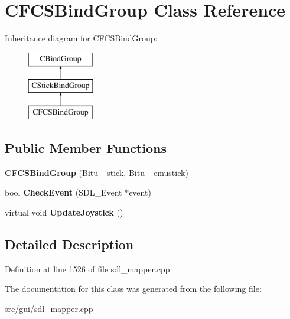 \hypertarget{classCFCSBindGroup}{\section{C\-F\-C\-S\-Bind\-Group Class Reference}
\label{classCFCSBindGroup}
}
Inheritance diagram for C\-F\-C\-S\-Bind\-Group\-:\begin{figure}[H]
\begin{center}
\leavevmode
\includegraphics[height=3.000000cm]{classCFCSBindGroup}
\end{center}
\end{figure}
\subsection*{Public Member Functions}
\begin{DoxyCompactItemize}
\item 
\hypertarget{classCFCSBindGroup_a366a39efa7db658cfdec657580818264}{{\bfseries C\-F\-C\-S\-Bind\-Group} (Bitu \-\_\-stick, Bitu \-\_\-emustick)}\label{classCFCSBindGroup_a366a39efa7db658cfdec657580818264}

\item 
\hypertarget{classCFCSBindGroup_a25a662090cb26b626cac51449c94e3af}{bool {\bfseries Check\-Event} (S\-D\-L\-\_\-\-Event $\ast$event)}\label{classCFCSBindGroup_a25a662090cb26b626cac51449c94e3af}

\item 
\hypertarget{classCFCSBindGroup_a19be69d6c38cc544b2b4517eeab84fef}{virtual void {\bfseries Update\-Joystick} ()}\label{classCFCSBindGroup_a19be69d6c38cc544b2b4517eeab84fef}

\end{DoxyCompactItemize}


\subsection{Detailed Description}


Definition at line 1526 of file sdl\-\_\-mapper.\-cpp.



The documentation for this class was generated from the following file\-:\begin{DoxyCompactItemize}
\item 
src/gui/sdl\-\_\-mapper.\-cpp\end{DoxyCompactItemize}
